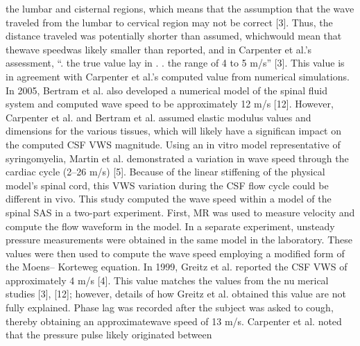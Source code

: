 \documentclass{report}
\begin{document}
the lumbar and cisternal regions, which means that the assumption
that the wave traveled from the lumbar to cervical region may not
be correct [3]. Thus, the distance traveled was potentially shorter than
assumed, whichwould mean that thewave speedwas likely smaller than
reported, and in Carpenter et al.’s assessment, “.
the true value lay in
. .
the range of 4 to 5 m/s” [3]. This value is in agreement with Carpenter
et al.’s computed value from numerical simulations. In 2005, Bertram
et al. also developed a numerical model of the spinal fluid system
and computed wave speed to be approximately 12 m/s [12]. However,
Carpenter et al. and Bertram et al. assumed elastic modulus values and
dimensions for the various tissues, which will likely have a significan
impact on the computed CSF VWS magnitude.
Using an in vitro model representative of syringomyelia, Martin
et al. demonstrated a variation in wave speed through the cardiac cycle
(2–26 m/s) [5]. Because of the linear stiffening of the physical model’s
spinal cord, this VWS variation during the CSF flow cycle could be
different in vivo. This study computed the wave speed within a model
of the spinal SAS in a two-part experiment. First, MR was used to
measure velocity and compute the flow waveform in the model. In a
separate experiment, unsteady pressure measurements were obtained
in the same model in the laboratory. These values were then used to
compute the wave speed employing a modified form of the Moens–
Korteweg equation. In 1999, Greitz et al. reported the CSF VWS of
approximately 4 m/s [4]. This value matches the values from the nu
merical
studies [3], [12]; however, details of how Greitz et al. obtained
this value are not fully explained.
Phase lag was recorded after the subject was
asked to cough, thereby obtaining an approximatewave speed of 13 m/s.
Carpenter et al. noted that the pressure pulse likely originated between
\end{document}
